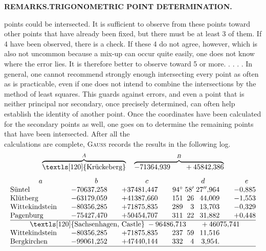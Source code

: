\par\clearpage
\noindent{}\hfill{\small\textbf{REMARKS.\quad TRIGONOMETRIC POINT DETERMINATION.}}\hfill\null\par\medskip

{\small
\noindent points could be intersected. It is sufficient to observe from these points toward other points that have already been fixed, but there must be at least 3 of them. If 4 have been observed, there is a check. If these 4 do not agree, however, which is also not uncommon because a mix-up can occur quite easily, one does not know where the error lies. It is therefore better to observe toward 5 or more. . . . . In general, one cannot recommend strongly enough intersecting every point as often as is practicable, even if one does not intend to combine the intersections by the method of least squares. This guards against errors, and even a point that is neither principal nor secondary, once precisely determined, can often help establish the identity of another point. Once the coordinates have been calculated for the secondary points as well, one goes on to determine the remaining points that have been intersected. After all the\\
calculations are complete, \textsc{Gauss} records the results in the following log.
\[
 \overbrace{\text{\textls[120]{Krückeberg}}}^{A}
 \quad\overbrace{-71364{,}939\qquad+45842{,}386}^{B}
\]
\[
\begin{array}{@{}l@{\qquad}r@{\qquad}r@{\qquad}r@{\;}r@{\;}r@{\qquad}r@{}}
 \multicolumn{1}{c}{a}&\multicolumn{1}{c}{b}&\multicolumn{1}{c}{c}&
 \multicolumn{3}{c}{d}&\multicolumn{1}{c@{}}{e}\\
 \text{Süntel}&-70637{,}258&+37481{,}447&94^\circ&58'&27''{,}964&-0{,}885\\
 \text{Klütberg}&-63179{,}059&+41387{,}660&151&26&44{,}009&-1{,}553\\
 \text{Wittekindstein}&-80356{,}285&+71875{,}835&289&3&13{,}703&-0{,}329\\
 \text{Pagenburg}&-75427{,}470&+50454{,}707&311&22&31{,}882&+0{,}448\\
 \hline
 \multicolumn{7}{c@{}}{\text{\textls[120]{Sachsenhagen, Castle}}\;-96486{,}713\qquad+46075{,}741}\\
 \text{Wittekindstein}&-80356{,}285&+71875{,}835&237&59&11{,}516&\\
 \text{Bergkirchen}&-99061{,}252&+47440{,}144&332&4&3{,}954.&\\
 \hline
\end{array}
\]

}
